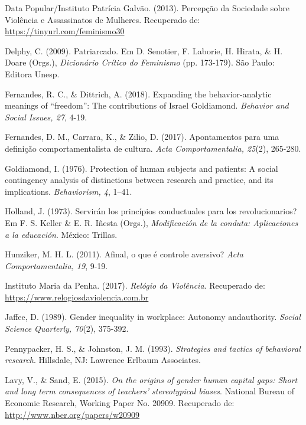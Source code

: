 \hangindent=25pt
\noindent Data Popular/Instituto Patrícia Galvão. (2013). Percepção da Sociedade sobre Violência e Assassinatos de Mulheres. Recuperado de: 
\url{https://tinyurl.com/feminismo30}

\hangindent=25pt
\noindent Delphy, C. (2009). Patriarcado. Em D. Senotier, F. Laborie, H. Hirata, \& H. Doare (Orgs.), \textit{Dicionário Crítico do Feminismo} (pp. 173-179). São Paulo: Editora Unesp.

\hangindent=25pt
\noindent Fernandes, R. C., \& Dittrich, A. (2018). Expanding the behavior-analytic meanings of ``freedom'': The contributions of Israel Goldiamond. \textit{Behavior and Social Issues, 27}, 4-19.

\hangindent=25pt
\noindent Fernandes, D. M., Carrara, K., \& Zilio, D. (2017). Apontamentos para uma definição comportamentalista de cultura. \textit{Acta Comportamentalia, 25}(2), 265-280.

\hangindent=25pt
\noindent Goldiamond, I. (1976). Protection of human subjects and patients: A social contingency analysis of distinctions between research and practice, and its implications. \textit{Behaviorism, 4}, 1–41.

\hangindent=25pt
\noindent Holland, J. (1973). Servirán los princípios conductuales para los revolucionarios? Em F. S. Keller \& E. R. Iñesta (Orgs.), \textit{Modificación de la conduta: Aplicaciones a la educación}. México: Trillas.

\hangindent=25pt
\noindent Hunziker, M. H. L. (2011). Afinal, o que é controle aversivo? \textit{Acta Comportamentalia, 19}, 9-19.

\hangindent=25pt
\noindent Instituto Maria da Penha. (2017). \textit{Relógio da Violência}. Recuperado de: \url{https://www.relogiosdaviolencia.com.br}

\hangindent=25pt
\noindent Jaffee, D. (1989). Gender inequality in workplace: Autonomy and\linebreak authority. \textit{Social Science Quarterly, 70}(2), 375-392.

\hangindent=25pt
\noindent Pennypacker, H. S., \& Johnston, J. M. (1993). \textit{Strategies and tactics of behavioral research}. Hillsdale, NJ: Lawrence Erlbaum Associates.

\hangindent=25pt
\noindent Lavy, V., \& Sand, E. (2015). \textit{On the origins of gender human capital gaps: Short and long term consequences of teachers’ stereotypical biases}. National Bureau of Economic Research, Working Paper No. 20909. Recuperado de: \url{http://www.nber.org/papers/w20909}

